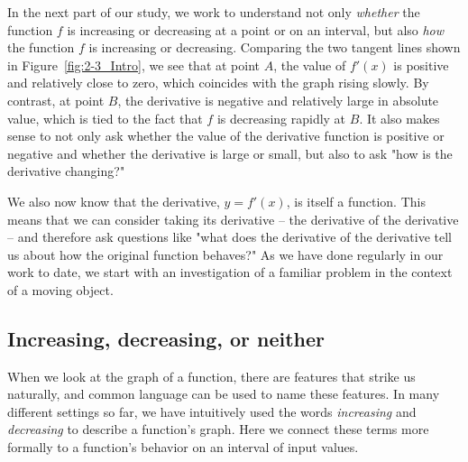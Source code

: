 In the next part of our study, we work to understand not only \emph{whether} the function $f$ is increasing or decreasing at a point or on an interval, but also \emph{how} the function $f$ is increasing or decreasing.  Comparing the two tangent lines shown in Figure~\ref{fig:2-3_Intro}, we see that at point $A$, the value of $f'(x)$ is positive and relatively close to zero, which coincides with the graph rising slowly.  By contrast, at point $B$, the derivative is negative and relatively large in absolute value, which is tied to the fact that $f$ is decreasing rapidly at $B$.  It also makes sense to not only ask whether the value of the derivative function is positive or negative and whether the derivative is large or small, but also to ask "how is the derivative changing?"

We also now know that the derivative, $y = f'(x)$, is itself a function.  This means that we can consider taking its derivative -- the derivative of the derivative -- and therefore ask questions like "what does the derivative of the derivative tell us about how the original function behaves?"  As we have done regularly in our work to date, we start with an investigation of a familiar problem in the context of a moving object.  


\subsection*{Increasing, decreasing, or neither}

When we look at the graph of a function, there are features that strike us naturally, and common language can be used to name these features.  In many different settings so far, we have intuitively used the words \emph{increasing} and \emph{decreasing} to describe a function's graph.  Here we connect these terms more formally to a function's behavior on an interval of input values.


